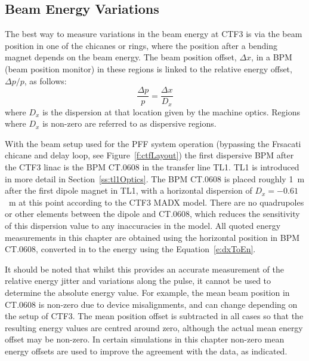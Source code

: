 \subsection{Beam Energy Variations}
\label{ss:energyVariations}

The best way to measure variations in the beam energy at CTF3 is via the beam position in one of the chicanes or rings, where the position after a bending magnet depends on the beam energy. The beam position offset, \(\Delta x\), in a BPM (beam position monitor) in these regions is linked to the relative energy offset, \(\Delta p / p\), as follows:
\begin{equation}
\frac{\Delta p}{p} = \frac{\Delta x}{D_x}
\label{e:dxToEn}
\end{equation}
where \(D_{x}\) is the dispersion at that location given by the machine optics. Regions where \(D_{x}\) is non-zero are referred to as dispersive regions.

With the beam setup used for the PFF system operation (bypassing the Frsacati chicane and delay loop, see Figure~\ref{f:ctfLayout}) the first dispersive BPM after the CTF3 linac is the BPM CT.0608 in the transfer line TL1.  TL1 is introduced in more detail in Section~\ref{ss:tl1Optics}. The BPM CT.0608 is placed roughly 1~m after the first dipole magnet in TL1, with a horizontal dispersion of \(D_{x} = -0.61\)~m at this point according to the CTF3 MADX model. There are no quadrupoles or other elements between the dipole and CT.0608, which reduces the sensitivity of this dispersion value to any inaccuracies in the model. All quoted energy measurements in this chapter are obtained using the horizontal position in BPM CT.0608, converted in to the energy using the Equation~\ref{e:dxToEn}. %

It should be noted that whilst this provides an accurate measurement of the relative energy jitter and variations along the pulse, it cannot be used to determine the absolute energy value. For example, the mean beam position in CT.0608 is non-zero due to device misalignments, and can change depending on the setup of CTF3. The mean position offset is subtracted in all cases so that the resulting energy values are centred around zero, although the actual mean energy offset may be non-zero. In certain simulations in this chapter non-zero mean energy offsets are used to improve the agreement with the data, as indicated.

